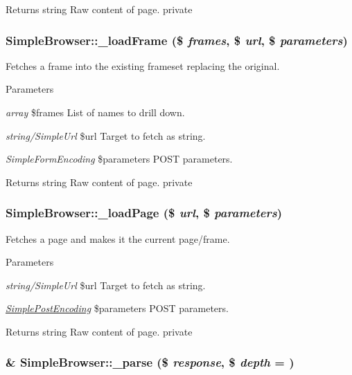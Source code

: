 \begin{DoxyReturn}{Returns}
string Raw content of page.  private 
\end{DoxyReturn}
\hypertarget{class_simple_browser_a4bda5280c9c6babbf5d0424e82f80fd4}{
\subsubsection[{\_\-loadFrame}]{\setlength{\rightskip}{0pt plus 5cm}SimpleBrowser::\_\-loadFrame (\$ {\em frames}, \/  \$ {\em url}, \/  \$ {\em parameters})}}
\label{class_simple_browser_a4bda5280c9c6babbf5d0424e82f80fd4}
Fetches a frame into the existing frameset replacing the original. 
\begin{DoxyParams}{Parameters}
\item[{\em array}]\$frames List of names to drill down. \item[{\em string/SimpleUrl}]\$url Target to fetch as string. \item[{\em SimpleFormEncoding}]\$parameters POST parameters. \end{DoxyParams}
\begin{DoxyReturn}{Returns}
string Raw content of page.  private 
\end{DoxyReturn}
\hypertarget{class_simple_browser_ac342b81f23bffe9adeab560679ab5bac}{
\subsubsection[{\_\-loadPage}]{\setlength{\rightskip}{0pt plus 5cm}SimpleBrowser::\_\-loadPage (\$ {\em url}, \/  \$ {\em parameters})}}
\label{class_simple_browser_ac342b81f23bffe9adeab560679ab5bac}
Fetches a page and makes it the current page/frame. 
\begin{DoxyParams}{Parameters}
\item[{\em string/SimpleUrl}]\$url Target to fetch as string. \item[{\em \hyperlink{class_simple_post_encoding}{SimplePostEncoding}}]\$parameters POST parameters. \end{DoxyParams}
\begin{DoxyReturn}{Returns}
string Raw content of page.  private 
\end{DoxyReturn}
\hypertarget{class_simple_browser_aaa3c3ddf5ec5c06f50a5cd91ce5fe75d}{
\subsubsection[{\_\-parse}]{\setlength{\rightskip}{0pt plus 5cm}\& SimpleBrowser::\_\-parse (\$ {\em response}, \/  \$ {\em depth} = {})}}
